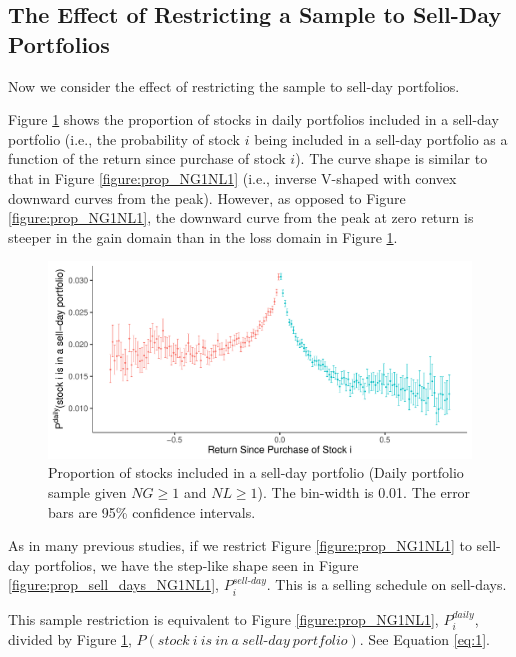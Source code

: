 \documentclass[11pt, a4paper]{article}
\begin{document}
\subsection{The Effect of Restricting a Sample to Sell-Day Portfolios}
\label{section:cond}

Now we consider the effect of restricting the sample to sell-day portfolios. 

Figure \ref{figure:prop_sell_day_NG1NL1} shows the proportion of stocks in daily portfolios included in a sell-day portfolio (i.e., the probability of stock $i$ being included in a sell-day portfolio as a function of the return since purchase of stock $i$). The curve shape is similar to that in Figure \ref{figure:prop_NG1NL1} (i.e., inverse V-shaped with convex downward curves from the peak). However, as opposed to Figure \ref{figure:prop_NG1NL1}, the downward curve from the peak at zero return is steeper in the gain domain than in the loss domain in Figure \ref{figure:prop_sell_day_NG1NL1}. 


\begin{figure}[H]
	\centering
	\includegraphics[width=0.8\columnwidth]{barc_port_sell_NG1_NL1_3.pdf}
	\caption{\small Proportion of stocks included in a sell-day portfolio (Daily portfolio sample given $NG\geq1$ and $NL\geq1$). The bin-width is 0.01. The error bars are 95\% confidence intervals.}
	\label{figure:prop_sell_day_NG1NL1}
\end{figure}

As in many previous studies, if we restrict Figure \ref{figure:prop_NG1NL1} to sell-day portfolios, we have the step-like shape seen in Figure \ref{figure:prop_sell_days_NG1NL1}, $P^{sell\mbox{-}day}_{i}$. This is a selling schedule on sell-days.

This sample restriction is equivalent to Figure \ref{figure:prop_NG1NL1}, $P^{daily}_{i}$, divided by Figure \ref{figure:prop_sell_day_NG1NL1}, $P(stock~i~is~in~a~sell\mbox{-}day~portfolio)$. See Equation \ref{eq:1}.\\
\end{document}
